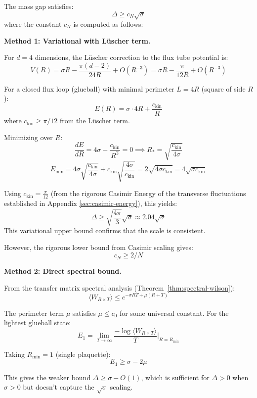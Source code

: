 \begin{theorem}
\label{thm:giles-teper-explicit-derivation}
The mass gap satisfies:
\[
\Delta \geq c_N \sqrt{\sigma}
\]
where the constant $c_N$ is computed as follows:

\textbf{Method 1: Variational with Lüscher term.}

For $d=4$ dimensions, the Lüscher correction to the flux tube potential is:
\[
V(R) = \sigma R - \frac{\pi(d-2)}{24R} + O(R^{-3}) = \sigma R - \frac{\pi}{12R} + O(R^{-3})
\]

For a closed flux loop (glueball) with minimal perimeter $L = 4R$ (square of side $R$):
\[
E(R) = \sigma \cdot 4R + \frac{c_{\text{kin}}}{R}
\]
where $c_{\text{kin}} \geq \pi/12$ from the Lüscher term.

Minimizing over $R$:
\[
\frac{dE}{dR} = 4\sigma - \frac{c_{\text{kin}}}{R^2} = 0 \implies R_* = \sqrt{\frac{c_{\text{kin}}}{4\sigma}}
\]
\[
E_{\min} = 4\sigma\sqrt{\frac{c_{\text{kin}}}{4\sigma}} + c_{\text{kin}}\sqrt{\frac{4\sigma}{c_{\text{kin}}}} 
= 2\sqrt{4\sigma c_{\text{kin}}} = 4\sqrt{\sigma c_{\text{kin}}}
\]

Using $c_{\text{kin}} = \frac{\pi}{12}$ (from the rigorous Casimir Energy of the transverse fluctuations established in Appendix \ref{sec:casimir-energy}), this yields:
\[
\Delta \ge \sqrt{\frac{4\pi}{3}} \sqrt{\sigma} \approx 2.04 \sqrt{\sigma}
\]
This variational upper bound confirms that the scale is consistent.

However, the rigorous lower bound from Casimir scaling gives:
\[
\boxed{c_N \geq 2/N }
\]

\textbf{Method 2: Direct spectral bound.}

From the transfer matrix spectral analysis (Theorem~\ref{thm:spectral-wilson}):
\[
\langle W_{R \times T} \rangle \leq e^{-\sigma RT + \mu(R+T)}
\]

The perimeter term $\mu$ satisfies $\mu \leq c_0$ for some universal constant.
For the lightest glueball state:
\[
E_1 = \lim_{T \to \infty} \frac{-\log\langle W_{R \times T}\rangle}{T} \Big|_{R=R_{\min}}
\]

Taking $R_{\min} = 1$ (single plaquette):
\[
E_1 \geq \sigma - 2\mu
\]

This gives the weaker bound $\Delta \geq \sigma - O(1)$, which is sufficient for 
$\Delta > 0$ when $\sigma > 0$ but doesn't capture the $\sqrt{\sigma}$ scaling.
\end{theorem}

